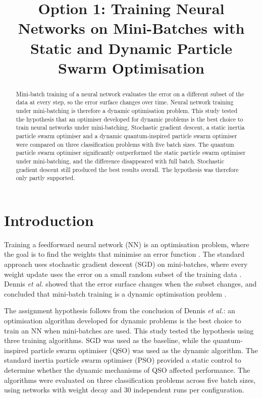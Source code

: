 \documentclass[conference]{IEEEtran}
\begin{document}
\title{Option 1: Training Neural Networks on Mini-Batches with Static and
Dynamic Particle Swarm Optimisation}

\author{
}

\maketitle

\begin{abstract}
Mini-batch training of a neural network evaluates the error on a
different subset of the data at every step, so the error surface
changes over time. Neural network training under mini-batching is
therefore a dynamic optimisation problem. This study tested the
hypothesis that an optimiser developed for dynamic problems is the best
choice to train neural networks under mini-batching. Stochastic
gradient descent, a static inertia particle swarm optimiser and a
dynamic quantum-inspired particle swarm optimiser were compared on three
classification problems with five batch sizes. The quantum particle
swarm optimiser significantly outperformed the static particle swarm
optimiser under mini-batching, and the difference disappeared with
full batch. Stochastic gradient descent still produced the best
results overall. The hypothesis was therefore only partly supported.
\end{abstract}

\section{Introduction}
Training a feedforward neural network (NN) is an optimisation problem,
where the goal is to find the weights that minimise an error function
\cite{engelbrecht2007}. The standard approach uses stochastic
gradient descent (SGD) on mini-batches, where every weight update uses
the error on a small random subset of the training data
\cite{dennis2021}. Dennis \textit{et al.} showed that the error
surface changes when the subset changes, and concluded that
mini-batch training is a dynamic optimisation problem
\cite{dennis2021}.

The assignment hypothesis follows from the conclusion of Dennis
\textit{et al.}: an optimisation algorithm developed for dynamic
problems is the best choice to train an NN when mini-batches are used.
This study tested the hypothesis using three training algorithms. SGD was 
used as the baseline, while the quantum-inspired particle swarm optimiser 
(QSO) was used as the dynamic algorithm. The standard inertia particle swarm 
optimiser (PSO) provided a static control to determine whether the dynamic 
mechanisms of QSO affected performance. The algorithms were evaluated on 
three classification problems across five batch sizes, using networks with 
weight decay and 30 independent runs per configuration.
\end{document}
